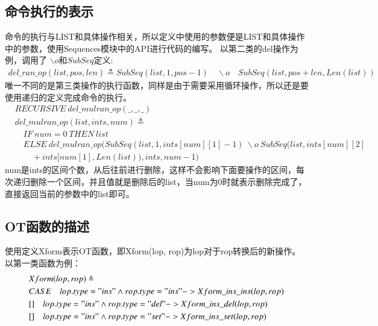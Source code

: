 \subsection{命令执行的表示}
命令的执行与LIST和具体操作相关，所以定义中使用的参数便是LIST和具体操作中的参数，使用Sequences模块中的API进行代码的编写。
以第二类的del操作为例，调用了 $\backslash o$和$SubSeq$定义:
\begin{align*}
del\_ran\_op(list,pos,len) \triangleq SubSeq(list, 1, pos-1) \quad \backslash o \quad SubSeq(list, pos+len, Len(list))
\end{align*}
唯一不同的是第三类操作的执行函数，同样是由于需要采用循环操作，所以还是要使用递归的定义完成命令的执行。
\begin{align*}
&RECURSIVE\ del\_mulran\_op(\_,\_,\_)\\
&del\_mulran\_op(list,ints,num) \triangleq \\
&  \quad  IF\ num = 0\ THEN\ list \\
&  \quad  ELSE\ del\_mulran\_op(SubSeq(list, 1, ints[num][1]-1)\ \backslash o\ SubSeq(list, ints[num][2]\\
&   \quad \quad  +ints[num[1],Len(list)),ints,num-1)    
\end{align*}
num是ints的区间个数，从后往前进行删除，这样不会影响下面要操作的区间，每次递归删除一个区间，并且值就是删除后的list，当num为0时就表示删除完成了，直接返回当前的参数中的list即可。

\subsection{OT函数的描述}
使用定义Xform表示OT函数，即Xform(lop, rop)为lop对于rop转换后的新操作。
以第一类函数为例：
\begin{align*}
&Xform(lop, rop) \triangleq \\
   & CASE \quad lop.type = "ins" \land rop.type = "ins" -> Xform\_ins\_ins(lop, rop)\\
   & []  \quad lop.type = "ins" \land rop.type = "del" -> Xform\_ins\_del(lop, rop)  \\
   & [] \quad  lop.type = "ins" \land rop.type = "set" -> Xform\_ins\_set(lop, rop)  
\end{align*}
